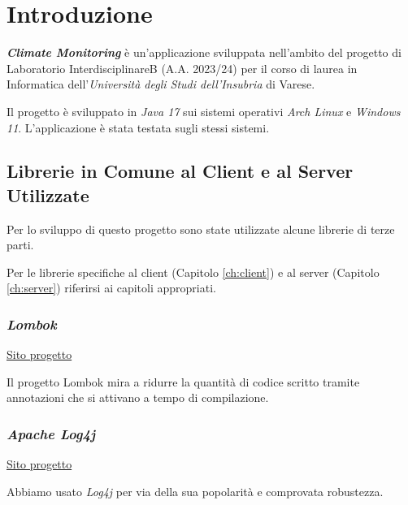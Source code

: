 \maketitle

\cleardoublepage
{}
{}
\tableofcontents

\listoffigures
\listoftables
\lstlistoflistings

\chapter{Introduzione}
\textsl{\textbf{Climate Monitoring}} è un'applicazione sviluppata nell’ambito del progetto di Laboratorio InterdisciplinareB (A.A. 2023/24) per il corso di laurea in Informatica dell’\textsl{Universit\`a degli Studi dell’Insubria} di Varese.

Il progetto è sviluppato in \textsl{Java 17} sui sistemi operativi \textsl{Arch Linux} e \textsl{Windows 11}.
L'applicazione è stata testata sugli stessi sistemi.

\section{Librerie in Comune al Client e al Server Utilizzate}

Per lo sviluppo di questo progetto sono state utilizzate alcune librerie di terze parti.

Per le librerie specifiche al client (Capitolo \ref{ch:client}) e al server (Capitolo \ref{ch:server}) riferirsi ai capitoli appropriati.

\subsection{\textsl{Lombok}}

\href{https://projectlombok.org/}{Sito progetto}

Il progetto Lombok mira a ridurre la quantità di codice scritto tramite annotazioni che si attivano a tempo di compilazione.

\subsection{\textsl{Apache Log4j}}

\href{https://logging.apache.org/log4j/2.x/}{Sito progetto}

Abbiamo usato \textsl{Log4j} per via della sua popolarità e comprovata robustezza.


